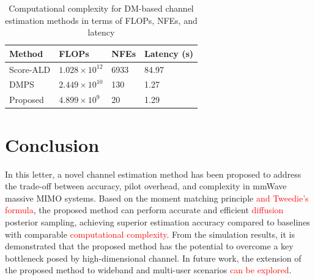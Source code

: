 \documentclass[lettersize,journal]{IEEEtran}
\newcommand{\tred}{\textcolor{red}}
\begin{document}
\begin{table}[!t]
\centering
\renewcommand{\arraystretch}{1.1} 
\caption{Computational complexity for DM-based channel estimation methods in terms of FLOPs, NFEs, and latency}
\label{tab:table1}
\begin{tabular}{M{0.20\columnwidth}|M{0.21\columnwidth}|M{0.20\columnwidth}|M{0.20\columnwidth}}
\hline
\textbf{Method} & \textbf{FLOPs} & \textbf{NFEs} & \textbf{Latency (s)} \\
\hline
Score-ALD\cite{arvinteMIMOChannelEstimation2023} & \(1.028 \times 10^{12}\) & 6933 & 84.97 \\
\hline
DMPS\cite{zhouGenerativeDiffusionModels2025} & \(2.449 \times 10^{10}\) & 130 & 1.27 \\
\hline
Proposed & \(4.899 \times 10^9\) & 20 & 1.29 \\
\hline
\end{tabular}
\end{table}

\section{Conclusion}

In this letter, a novel channel estimation method has been proposed to address the trade-off between accuracy, pilot overhead, and complexity in mmWave massive MIMO systems. Based on the moment matching principle \tred{and Tweedie's formula}, the proposed method can perform accurate and efficient \tred{diffusion} posterior sampling, achieving superior estimation accuracy compared to baselines with comparable \tred{computational complexity}. From the simulation results, it is demonstrated that the proposed method has the potential to overcome a key bottleneck posed by high-dimensional channel. In future work, the extension of the proposed method to wideband and multi-user scenarios \tred{can be explored}.


% 

\end{document}
